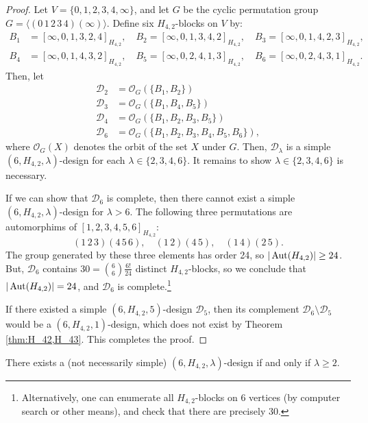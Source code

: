 \begin{proof}
Let $V = \{0,1,2,3,4,\infty\}$, and let $G$ be the cyclic permutation group $G = \langle (0 \, 1 \, 2 \, 3 \, 4)(\infty) \rangle$.
Define six $H_{4,2}$-blocks on $V$ by:
\begin{align*}
  B_1 &= [\infty, 0, 1, 3, 2, 4]_{H_{4,2}}, \quad
  B_2 = [\infty, 0, 1, 3, 4, 2]_{H_{4,2}}, \quad
  B_3 = [\infty, 0, 1, 4, 2, 3]_{H_{4,2}}, \\
  B_4 &= [\infty, 0, 1, 4, 3, 2]_{H_{4,2}}, \quad
  B_5 =  [\infty, 0, 2, 4, 1, 3]_{H_{4,2}}, \quad
  B_6 = [\infty, 0, 2, 4, 3, 1]_{H_{4,2}}.
\end{align*}
Then, let
\begin{align*}
  \mathcal{D}_2
  &= \mathcal{O}_G(\{B_1, B_2\}) \\
  \mathcal{D}_3
  &= \mathcal{O}_G(\{B_1, B_4, B_5\}) \\
  \mathcal{D}_4
  &= \mathcal{O}_G(\{B_1, B_2, B_3, B_5\}) \\
  \mathcal{D}_6
  &= \mathcal{O}_G(\{B_1, B_2, B_3, B_4, B_5, B_6\}),
\end{align*}
where $\mathcal{O}_G(X)$ denotes the orbit of the set $X$ under $G$.
Then, $\mathcal{D}_\lambda$ is a simple $(6, H_{4,2}, \lambda)$-design for each $\lambda \in \{2, 3, 4, 6\}$.
It remains to show $\lambda \in \{2, 3, 4, 6\}$ is necessary.

If we can show that $\mathcal{D}_6$ is complete, then there cannot exist a simple $(6, H_{4,2}, \lambda)$-design for $\lambda > 6$.
The following three permutations are automorphims of $[1, 2, 3, 4, 5, 6]_{H_{4,2}}$:
\[
  (1 \, 2 \, 3) (4 \, 5 \, 6), \quad (1 \, 2) (4 \, 5), \quad (1 \, 4) (2 \, 5).
\]
The group generated by these three elements has order 24, so $|\operatorname{Aut}(H_{4,2})| \geq 24$.
But, $\mathcal{D}_6$ contains $30 = {6 \choose 6} \frac{6!}{24}$ distinct $H_{4,2}$-blocks,
  so we conclude that $|\operatorname{Aut}(H_{4,2})| = 24$, and $\mathcal{D}_6$ is complete.\footnote{Alternatively,
  one can enumerate all $H_{4,2}$-blocks on 6 vertices (by computer search or other means), and check that there are precisely 30.}

If there existed a simple $(6, H_{4,2}, 5)$-design $\mathcal{D}_5$, then its complement
  $\mathcal{D}_6 \setminus \mathcal{D}_5$ would be a $(6, H_{4,2}, 1)$-design, which does not exist by Theorem \ref{thm:H_42,H_43}.
This completes the proof.
\end{proof}

\begin{theorem} \label{thm:H_42-6}
There exists a (not necessarily simple) $(6, H_{4,2}, \lambda)$-design if and only if $\lambda \geq 2$.
\end{theorem}

